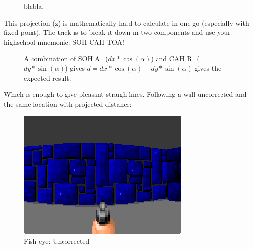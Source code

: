 \begin{figure}[H]
\centering
 
 \caption{blabla.} \label{fig:Raycasting2}
\end{figure}

This projection (z) is mathematically hard to calculate in one go (especially with fixed point). The trick is to break it down in two components and use your highschool mnemonic: SOH-CAH-TOA!\\

\begin{figure}[H]
\centering
 
 \caption{A combination of SOH A=($dx * \cos(\alpha)$) and CAH B=($ dy * \sin(\alpha) $) gives $d = dx * \cos(\alpha) - dy * \sin(\alpha) $ gives the expected result.}
\end{figure}

 Which is enough to give pleasant straigh lines. Following a wall uncorrected and the same location with projected distance:\\
 \begin{figure}[H]
\centering
 \includegraphics[width=\textwidth]{imgs/fish_eye/fish_eye.png}
  \caption{Fish eye: Uncorrected} 
 \end{figure}
 

